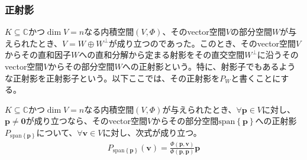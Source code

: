 \documentclass[dvipdfmx]{jsarticle}
\begin{document}
\subsubsection{正射影}%
\begin{dfn}
$K \subseteq \mathbb{C}$かつ$\dim V = n$なる内積空間$(V,\varPhi )$、そのvector空間$V$の部分空間$W$が与えられたとき、$V = W \oplus W^{\bot}$が成り立つのであった。このとき、そのvector空間$V$からその直和因子$W$への直和分解から定まる射影をその直交空間$W^{\bot}$に沿うそのvector空間$V$からその部分空間$W$への正射影という。特に、射影子でもあるような正射影を正射影子という。以下ここでは、その正射影を$P_{W}$と書くことにする。
\end{dfn}
\begin{thm}\label{2.3.7.15}
$K \subseteq \mathbb{C}$かつ$\dim V = n$なる内積空間$(V,\varPhi )$が与えられたとき、$\forall\mathbf{p} \in V$に対し、$\mathbf{p} \neq \mathbf{0}$が成り立つなら、そのvector空間$V$からその部分空間$\mathrm{span}\left\{ \mathbf{p} \right\}$への正射影$P_{\mathrm{span}\left\{ \mathbf{p} \right\}}$について、$\forall\mathbf{v} \in V$に対し、次式が成り立つ。
\begin{align*}
P_{\mathrm{span}\left\{ \mathbf{p} \right\}}\left( \mathbf{v} \right) = \frac{\varPhi \left( \mathbf{p},\mathbf{v} \right)}{\varPhi \left( \mathbf{p},\mathbf{p} \right)}\mathbf{p}
\end{align*}
\end{thm}
\end{document}

